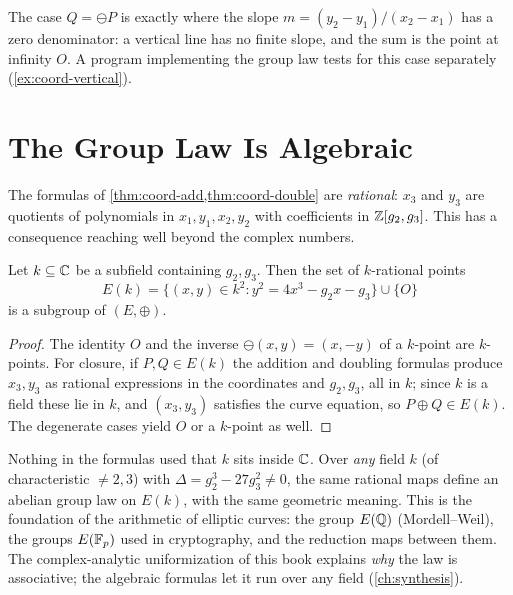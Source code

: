 The case \(Q = \ominus P\) is exactly where the slope \(m = (y_2-y_1)/(x_2-x_1)\)
has a zero denominator: a vertical line has no finite slope, and the sum is the
point at infinity \(O\). A program implementing the group law tests for this case
separately (\cref{ex:coord-vertical}).

\section{The Group Law Is Algebraic}
\label{sec:coord-algebraic}

The formulas of \cref{thm:coord-add,thm:coord-double} are \emph{rational}: \(x_3\)
and \(y_3\) are quotients of polynomials in \(x_1, y_1, x_2, y_2\) with
coefficients in \(\mathbb{Z}[g_2, g_3]\). This has a consequence reaching well beyond the
complex numbers.

\begin{proposition}
\label{prop:coord-field}
Let \(k \subseteq \mathbb{C}\) be a subfield containing \(g_2, g_3\). Then the set of
\(k\)-rational points
\[
  E(k) = \{ (x,y) \in k^2 : y^2 = 4x^3 - g_2 x - g_3 \} \cup \{O\}
\]
is a subgroup of \((E, \oplus)\).
\end{proposition}

\begin{proof}
The identity \(O\) and the inverse \(\ominus(x,y) = (x,-y)\) of a \(k\)-point are
\(k\)-points. For closure, if \(P, Q \in E(k)\) the addition and doubling formulas
produce \(x_3, y_3\) as rational expressions in the coordinates and \(g_2, g_3\),
all in \(k\); since \(k\) is a field these lie in \(k\), and \((x_3,y_3)\)
satisfies the curve equation, so \(P \oplus Q \in E(k)\). The degenerate cases
yield \(O\) or a \(k\)-point as well.
\end{proof}

\begin{remark}
\label{rem:coord-anyfield}
Nothing in the formulas used that \(k\) sits inside \(\mathbb{C}\). Over \emph{any} field
\(k\) (of characteristic \(\ne 2, 3\)) with \(\Delta = g_2^3 - 27 g_3^2 \ne 0\), the
same rational maps define an abelian group law on \(E(k)\), with the same
geometric meaning. This is the foundation of the arithmetic of elliptic curves:
the group \(E(\mathbb{Q})\) (Mordell--Weil), the groups \(E(\mathbb{F}_p)\) used in cryptography,
and the reduction maps between them. The complex-analytic uniformization of this
book explains \emph{why} the law is associative; the algebraic formulas let it run
over any field (\cref{ch:synthesis}).
\end{remark}

